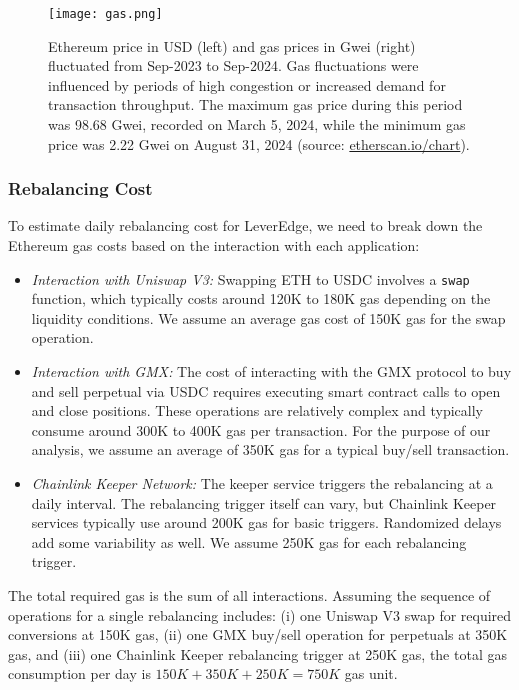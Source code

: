 \begin{figure}[t]
	\texttt{[image: gas.png]}
	\caption{Ethereum price in USD (left) and gas prices in Gwei (right) fluctuated from Sep-2023 to Sep-2024. Gas fluctuations were influenced by periods of high congestion or increased demand for transaction throughput. The maximum gas price during this period was 98.68 Gwei, recorded on March 5, 2024, while the minimum gas price was 2.22 Gwei on August 31, 2024 (source: \url{etherscan.io/chart}).}
	\label{fig:gas}
\end{figure}

\subsubsection{Rebalancing Cost}
To estimate daily rebalancing cost for LeverEdge, we need to break down the Ethereum gas costs based on the interaction with each application:
\begin{itemize}[leftmargin=*] 
	\item \textit{Interaction with Uniswap V3:} Swapping ETH to USDC involves a \texttt{swap} function, which typically costs around 120K to 180K gas depending on the liquidity conditions. We assume an average gas cost of 150K gas for the swap operation.
	
	\item \textit{Interaction with GMX:} The cost of interacting with the GMX protocol to buy and sell perpetual via USDC requires executing smart contract calls to open and close positions. These operations are relatively complex and typically consume around 300K to 400K gas per transaction. For the purpose of our analysis, we assume an average of 350K gas for a typical buy/sell transaction.
	
	\item \textit{Chainlink Keeper Network:} The keeper service triggers the rebalancing at a daily interval. The rebalancing trigger itself can vary, but Chainlink Keeper services typically use around 200K gas for basic triggers. Randomized delays add some variability as well. We assume 250K gas for each rebalancing trigger.
\end{itemize}
The total required gas is the sum of all interactions. Assuming the sequence of operations for a single rebalancing includes: (i) one Uniswap V3 swap for required conversions at 150K gas, (ii) one GMX buy/sell operation for perpetuals at 350K gas, and (iii) one Chainlink Keeper rebalancing trigger at 250K gas, the total gas consumption per day is \(150K + 350K + 250K = 750K\) gas unit. 

